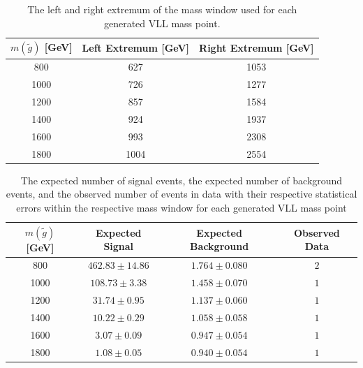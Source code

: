 \begin{table}[!htbp]
  \begin{center}
    \begin{tabular}{ccc}
        \hline
        $m(\tilde{g})$ [GeV]  & Left Extremum [GeV] & Right Extremum [GeV] \\
        \hline
        800    & 627 & 1053 \\
        1000    & 726 & 1277 \\
        1200    & 857 & 1584 \\
        1400    & 924 & 1937 \\
        1600    & 993 & 2308 \\
        1800    & 1004 & 2554 \\
        \hline
    \end{tabular}
  \end{center}
  \caption{The left and right extremum of the mass window used for each generated \ac{VLL} mass point.}
  \label{tab:window_stable}
\end{table}

\begin{table}[!htbp]
  \begin{center}
    \begin{tabular}{c|c|c|c}
      \hline
      $m(\tilde{g})$ [GeV]  & Expected Signal & Expected Background & Observed Data\\
      \hline
      800    & $462.83 \pm 14.86 $ & $1.764 \pm 0.080 $ & $2$ \\
      1000   & $108.73 \pm 3.38 $  & $1.458 \pm 0.070 $ & $1$ \\
      1200   & $31.74 \pm 0.95 $   & $1.137 \pm 0.060 $ & $1$ \\
      1400   & $10.22 \pm 0.29 $   & $1.058 \pm 0.058 $ & $1$ \\
      1600   & $3.07 \pm 0.09 $    & $0.947 \pm 0.054 $ & $1$ \\
      1800   & $1.08 \pm 0.05 $    & $0.940 \pm 0.054 $ & $1$ \\
      \hline
    \end{tabular}
  \end{center} 
  \caption{The expected number of signal events, the expected number of background events, and the observed number of events in data with their respective statistical errors within the respective mass window for each generated \ac{VLL} mass point}
  \label{tab:counts_stable}
\end{table}

